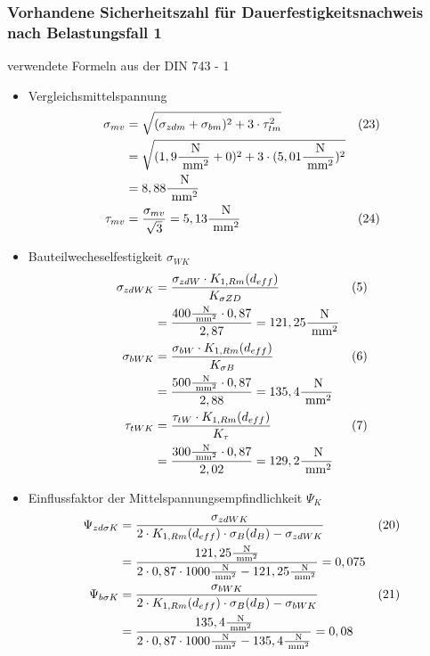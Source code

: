 \subsubsection{Vorhandene Sicherheitszahl für Dauerfestigkeitsnachweis nach Belastungsfall 1 }
verwendete Formeln aus der DIN 743 - 1
\begin{itemize}
	\item Vergleichsmittelspannung 
	\begin{align*}
	\sigma_{mv}&= \sqrt{(\sigma_{zdm} +\sigma_{bm} )^2+ 3 \cdot \tau_{tm}^2 } & (23) \\
	&= \sqrt{(1,9 \frac{\text{ N}}{\text{ mm}^2} +0 )^2+ 3 \cdot (5,01 \frac{\text{ N}}{\text{ mm}^2})^2 }  \\
	&= 8,88 \frac{\text{ N}}{\text{ mm}^2} \\
	\tau_{mv} &= \frac{\sigma_{mv}}{\sqrt{3}} = 5,13 \frac{\text{ N}}{\text{ mm}^2} & (24)
	\end{align*}
	\item Bauteilwecheselfestigkeit $\sigma_{WK}$ 
	\begin{align*}
	\sigma_{zdWK}&= \frac{\sigma_{zdW} \cdot K_{1,Rm} (d_{eff})}{K_{\sigma ZD}}  & (5)\\
	&=  \frac{400 \frac{\text{ N}}{\text{ mm}^2}\cdot 0,87}{2,87} = 121,25 \frac{\text{ N}}{\text{ mm}^2}\\
	\sigma_{bWK}&= \frac{\sigma_{bW} \cdot K_{1,Rm} (d_{eff})}{K_{\sigma B}}  & (6 )\\
	&=  \frac{500 \frac{\text{ N}}{\text{ mm}^2}\cdot 0,87}{2,88} = 135,4 \frac{\text{ N}}{\text{ mm}^2}\\
	\tau_{tWK}&= \frac{\tau_{tW} \cdot K_{1,Rm} (d_{eff})}{K_{\tau}} &(7) \\
	&=  \frac{300 \frac{\text{ N}}{\text{ mm}^2}\cdot 0,87}{2,02} = 129,2 \frac{\text{ N}}{\text{ mm}^2}
	\end{align*}
	\item Einflussfaktor der Mittelspannungsempfindlichkeit $\Psi_{K}$ 
	\begin{align*}
	\Psi_{zd \sigma K}&= \frac{\sigma_{zdWK}}{2 \x  K_{1,Rm} (d_{eff}) \x \sigma_B (d_B) -\sigma_{zdWK}}  &(20)\\
	&=  \frac{121,25 \frac{\text{ N}}{\text{ mm}^2}}{2 \x 0,87 \x 1000\frac{\text{ N}}{\text{ mm}^2} - 121,25 \frac{\text{ N}}{\text{ mm}^2}} = 0,075 \\
	\Psi_{b \sigma K}&= \frac{\sigma_{bWK}}{2 \x  K_{1,Rm} (d_{eff}) \x \sigma_B (d_B) -\sigma_{bWK}} &(21) \\
	&=  \frac{135,4 \frac{\text{ N}}{\text{ mm}^2}}{2 \x 0,87 \x 1000\frac{\text{ N}}{\text{ mm}^2} - 135,4 \frac{\text{ N}}{\text{ mm}^2}} = 0,08 \\

\end{align*}
\end{itemize}
